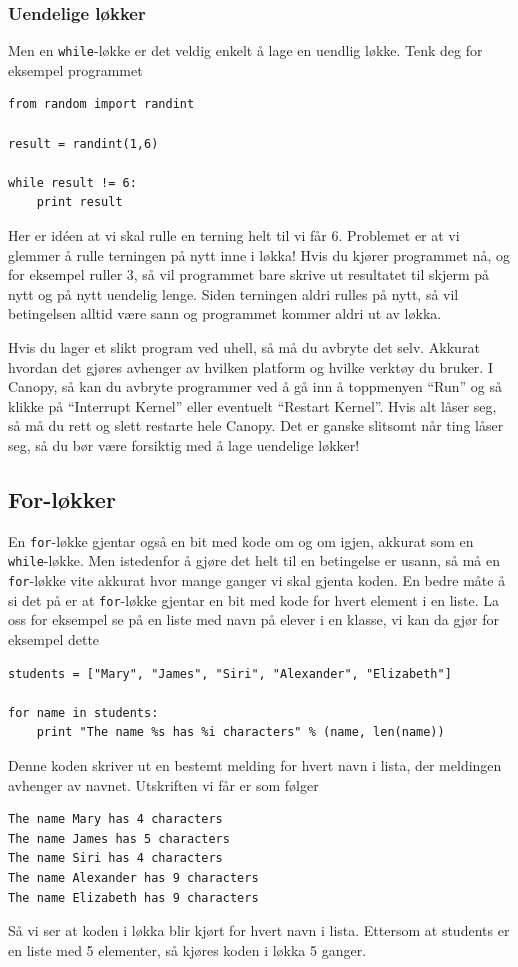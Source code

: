 \documentclass[a4paper, 11pt, notitlepage]{article}
\begin{document}
\subsubsection*{Uendelige løkker}
Men en \verb+while+-løkke er det veldig enkelt å lage en uendlig løkke. Tenk deg for eksempel programmet
\begin{lstlisting}
from random import randint

result = randint(1,6)

while result != 6:
	print result
\end{lstlisting}
Her er idéen at vi skal rulle en terning helt til vi får 6. Problemet er at vi glemmer å rulle terningen på nytt inne i løkka! Hvis du kjører programmet nå, og for eksempel ruller 3, så vil programmet bare skrive ut resultatet til skjerm på nytt og på nytt uendelig lenge. Siden terningen aldri rulles på nytt, så vil betingelsen alltid være sann og programmet kommer aldri ut av løkka.

Hvis du lager et slikt program ved uhell, så må du avbryte det selv. Akkurat hvordan det gjøres avhenger av hvilken platform og hvilke verktøy du bruker. I Canopy, så kan du avbryte programmer ved å gå inn å toppmenyen ``Run'' og så klikke på ``Interrupt Kernel'' eller eventuelt ``Restart Kernel''. Hvis alt låser seg, så må du rett og slett restarte hele Canopy. Det er ganske slitsomt når ting låser seg, så du bør være forsiktig med å lage uendelige løkker!


\subsection*{For-løkker}

En \verb+for+-løkke gjentar også en bit med kode om og om igjen, akkurat som en \verb+while+-løkke. Men istedenfor å gjøre det helt til en betingelse er usann, så må en \verb+for+-løkke vite akkurat hvor mange ganger vi skal gjenta koden. En bedre måte å si det på er at \verb+for+-løkke gjentar en bit med kode for hvert element i en liste. La oss for eksempel se på en liste med navn på elever i en klasse, vi kan da gjør for eksempel dette
\begin{lstlisting}
students = ["Mary", "James", "Siri", "Alexander", "Elizabeth"]

for name in students:
	print "The name %s has %i characters" % (name, len(name)) 
\end{lstlisting}
Denne koden skriver ut en bestemt melding for hvert navn i lista, der meldingen avhenger av navnet. Utskriften vi får er som følger
\begin{verbatim}
The name Mary has 4 characters
The name James has 5 characters
The name Siri has 4 characters
The name Alexander has 9 characters
The name Elizabeth has 9 characters
\end{verbatim}
Så vi ser at koden i løkka blir kjørt for hvert navn i lista. Ettersom at students er en liste med 5 elementer, så kjøres koden i løkka 5 ganger.
\end{document}
